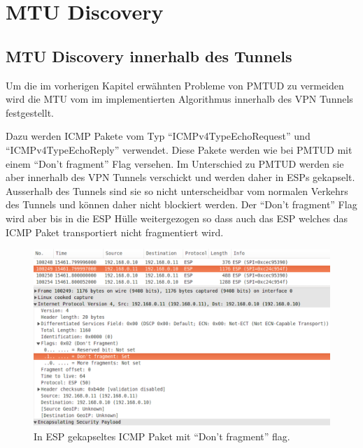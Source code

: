 \section{MTU Discovery}
\label{sec:MTU Discovery}


\subsection{MTU Discovery innerhalb des Tunnels}
Um die im vorherigen Kapitel erwähnten Probleme von \acs{PMTUD} zu vermeiden wird die \acs{MTU} vom im \tool{} implementierten Algorithmus innerhalb des \acs{VPN} Tunnels festgestellt.

Dazu werden \acs{ICMP} Pakete vom Typ \enquote{ICMPv4TypeEchoRequest} und \enquote{ICMPv4TypeEchoReply} verwendet. Diese Pakete werden wie bei \acs{PMTUD} mit einem \enquote{Don't fragment} Flag versehen. Im Unterschied zu \acs{PMTUD} werden sie aber innerhalb des \acs{VPN} Tunnels verschickt und werden daher in \acs{ESP}s gekapselt. Ausserhalb des Tunnels sind sie so nicht unterscheidbar vom normalen Verkehrs des Tunnels und können daher nicht blockiert werden. Der \enquote{Don't fragment} Flag wird aber bis in die \acs{ESP} Hülle weitergezogen so dass auch das \acs{ESP} welches das \acs{ICMP} Paket transportiert nicht fragmentiert wird.

\begin{figure}[ht]
    \begin{center}
        \includegraphics[trim=1 0 0 0,clip,width=\textwidth]{mainpart/implementation/img/ESP_DontFragment}
    \end{center}
    \caption{In ESP gekapseltes ICMP Paket mit \enquote{Don't fragment} flag.}
\end{figure}

